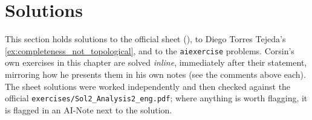 

\section{Solutions}
\label{sec:week02_solutions}

\begin{ainote}
This section holds solutions to the official sheet (), to Diego Torres
Tejeda's \cref{ex:completeness_not_topological}, and to the \texttt{aiexercise} problems.
Corsin's own exercises in this chapter are solved \emph{inline}, immediately after their
statement, mirroring how he presents them in his own notes (see the  comments
above each). The sheet solutions were worked independently and then checked against the official
\texttt{exercises/Sol2\_Analysis2\_eng.pdf}; where anything is worth flagging, it is flagged in
an AI-Note next to the solution.
\end{ainote}

